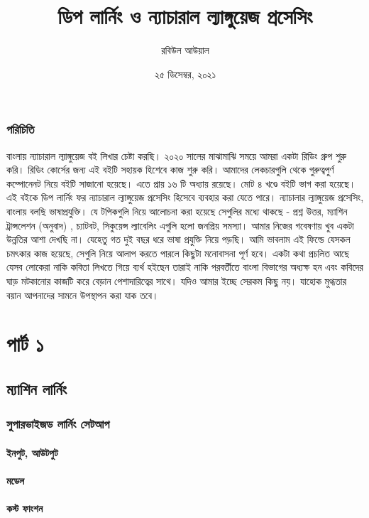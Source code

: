 \documentclass{book}
\title{ডিপ লার্নিং ও ন্যাচারাল ল্যাঙ্গুয়েজ প্রসেসিং}
\author{রবিউল আউয়াল}
\date{২৫  ডিসেম্বর, ২০২১}
\begin{document}
\maketitle

\tableofcontents


\section{পরিচিতি }
বাংলায় ন্যাচারাল ল্যাঙ্গুয়েজ  বই লিখার চেষ্টা করছি। 
২০২০ সালের মাঝামাঝি সময়ে আমরা একটা রিডিং গ্রুপ শুরু করি। রিডিং কোর্সের জন্য এই বইটি সহায়ক হিশেবে কাজ শুরু করি।
আমাদের লেকচারগুলি থেকে গুরুত্বপুর্ণ কম্পোনেনট নিয়ে বইটি সাজানো হয়েছে। এতে প্রায় ১৬ টি অধ্যায় রয়েছে। মোট ৪ খণ্ডে বইটি ভাগ করা হয়েছে।   
এই বইকে ডিপ লার্নিং ফর ন্যাচারাল ল্যাঙ্গুয়েজ প্রসেসিং হিসেবে ব্যবহার করা যেতে পারে। 
ন্যাচালার ল্যাঙ্গুয়েজ প্রসেসিং, বাংলায় বলছি ভাষাপ্রযুক্তি। যে টপিকগুলি নিয়ে আলোচনা করা হয়েছে সেগুলির মধ্যে থাকছে - প্রশ্ন উত্তর, ম্যাশিন ট্রান্সলেশন (অনুবাদ) , চ্যাটবট, সিকুয়েন্স ল্যাবেলিং এগুলি হলো জনপ্রিয় সমস্যা। আমার নিজের গবেষণায় খুব একটা উন্নতির আশা দেখছি না। যেহেতু গত দুই বছর ধরে ভাষা প্রযুক্তি নিয়ে পড়ছি। আমি ভাবলাম এই ফিল্ডে যেসকল চমৎকার কাজ হয়েছে, সেগুলি নিয়ে 
আলাপ করতে পারলে কিছুটা মনোবাসনা পূর্ণ হবে। একটা কথা প্রচলিত আছে যেসব লোকেরা নাকি কবিতা লিখতে গিয়ে ব্যর্থ হইছেন তারাই নাকি পরবর্তীতে বাংলা বিভাগের অধ্যক্ষ হন এবং কবিদের ঘাড় মটকানোর 
কাজটি করে বেড়ান পেশাদারিত্বের সাথে। যদিও আমার ইচ্ছে সেরকম কিছু নয়। যাহোক মুগ্ধতার বয়ান আপনাদের সামনে উপস্থাপন করা যাক তবে।

 \part{পার্ট ১} 
\chapter{ম্যাশিন লার্নিং}
\section{সুপারভাইজড লার্নিং সেটআপ}
\subsection{ইনপুট, আউটপুট}
\subsection{মডেল}
\subsection{কস্ট ফাংশন}
\end{document}
